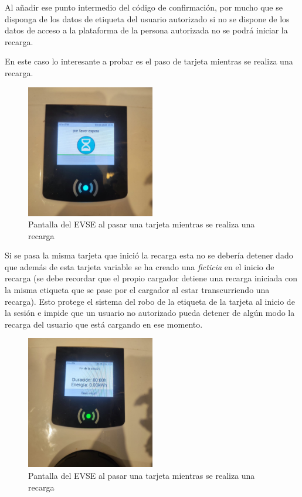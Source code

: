 \documentclass[12pt,a4paper,onecolumn,oneside]{report}
\newcounter{subsubsubsection}[subsubsection]
\begin{document}
Al añadir ese punto intermedio del código de confirmación, por mucho que se disponga de los datos de etiqueta del usuario autorizado si no se dispone de los datos de acceso a la plataforma de la persona autorizada no se podrá iniciar la recarga.


En este caso lo interesante a probar es el paso de tarjeta mientras se realiza una recarga.

\begin{figure}[H] 
\centering
  \includegraphics[width=0.5\textwidth]{figuras/prueba5.png}
  \caption[Pantalla del EVSE al pasar una tarjeta mientras se realiza una recarga]{Pantalla del EVSE al pasar una tarjeta mientras se realiza una recarga\\
  }
  \label{fig:prueba5}
\end{figure}

Si se pasa la misma tarjeta que inició la recarga esta no se debería detener dado que además de esta tarjeta variable se ha creado una \textit{ficticia} en el inicio de recarga (se debe recordar que el propio cargador detiene una recarga iniciada con la misma etiqueta que se pase por el cargador al estar transcurriendo una recarga). Esto protege el sistema del robo de la etiqueta de la tarjeta al inicio de la sesión e impide que un usuario no autorizado pueda detener de algún modo la recarga del usuario que está cargando en ese momento. 

\begin{figure}[H] 
\centering
  \includegraphics[width=0.5\textwidth]{figuras/prueba6.png}
  \caption[Pantalla del EVSE al pasar una tarjeta mientras se realiza una recarga]{Pantalla del EVSE al pasar una tarjeta mientras se realiza una recarga\\
  }
  \label{fig:prueba6}
\end{figure}
\end{document}

